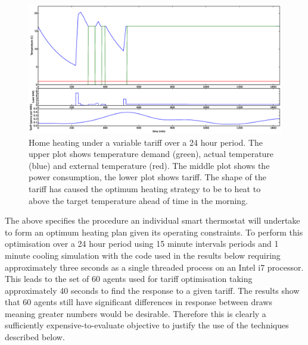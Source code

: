 \documentclass[a4paper, 10 pt, conference]{ieeeconf}  %
\begin{document}
\begin{figure}[htb]

\centering
\includegraphics[width=\textwidth,trim =4cm 8cm 4cm 2cm,clip=True]{f4.eps}
\caption{Home heating under a variable tariff over a 24 hour period. The upper plot shows temperature demand (green), actual temperature (blue) and external temperature (red). The middle plot shows the power consumption, the lower plot shows tariff. The shape of the tariff has caused the optimum  heating strategy to be to heat to above the target temperature ahead of time in the morning.}
\label{quadtemp}
\end{figure}

The above specifies the procedure an individual smart thermostat will undertake to form an optimum heating plan given its operating constraints. To perform this optimisation over a 24 hour period using 15 minute intervals periods and 1 minute cooling simulation with the code used in the results below requiring approximately three seconds as a single threaded process on an Intel i7 processor. This leads to the set of 60 agents used for tariff optimisation taking approximately 40 seconds to find the response to a given tariff. The results show that 60 agents still have significant differences in response between draws meaning greater numbers would be desirable. Therefore this is clearly a sufficiently expensive-to-evaluate objective to justify the use of the techniques described below. 
\end{document}

